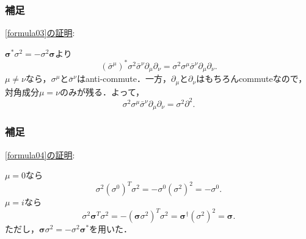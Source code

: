 \documentclass[pdflatex,unicode,ja=standard,12pt]{beamer}
\begin{document}
\begin{frame}[noframenumbering]

  \frametitle{補足 \subsecname}
  \thispagestyle{empty}

  \uline{\eqref{formula03}の証明}:

  \vspace{10pt}

  $\bm{\sigma}^{*}\sigma^2=-\sigma^2\bm{\sigma}$より
  \begin{equation}
    (\bar{\sigma}^{\mu})^{*}\sigma^2\bar{\sigma}^{\nu}\partial_{\mu}\partial_{\nu}
    =
    \sigma^2\sigma^{\mu}\bar{\sigma}^{\nu}\partial_{\mu}\partial_{\nu}
    .
  \end{equation}
  $\mu\neq\nu$なら，$\sigma^{\mu}$と$\bar{\sigma}^{\nu}$はanti-commute．一方，$\partial_{\mu}$と$\partial_{\nu}$はもちろんcommuteなので，対角成分$\mu=\nu$のみが残る．よって，
  \begin{equation}
    \sigma^2\sigma^{\mu}\bar{\sigma}^{\nu}\partial_{\mu}\partial_{\nu}
    =
    \sigma^2 \partial^2
    .
  \end{equation}

\end{frame}

\begin{frame}[noframenumbering]

  \frametitle{補足 \subsecname}
  \thispagestyle{empty}

  \uline{\eqref{formula04}の証明}:

  \vspace{10pt}

  $\mu=0$なら
  \begin{equation}
    \sigma^2(\sigma^0)^{T}\sigma^2
    =
    -\sigma^0(\sigma^2)^2
    =
    -\sigma^0
    .
  \end{equation}
  $\mu=i$なら
  \begin{equation}
    \sigma^2\bm{\sigma}^{T}\sigma^2
    =
    -(\bm{\sigma}\sigma^2)^{T}\sigma^2
    =
    \bm{\sigma}^{\dag}(\sigma^2)^2
    =
    \bm{\sigma}
    .
  \end{equation} 
  ただし，$\bm{\sigma}\sigma^2=-\sigma^2\bm{\sigma}^{*}$を用いた． 

\end{frame}
\end{document}

